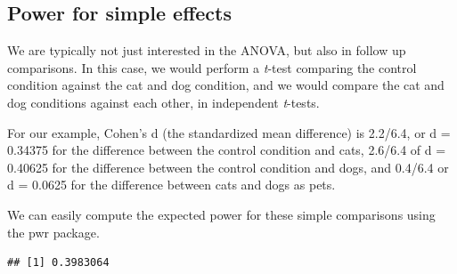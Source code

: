 \documentclass[
]{book}
\newenvironment{Shaded}{\begin{snugshade}}{\end{snugshade}}
\newcommand{\DataTypeTok}[1]{\textcolor[rgb]{0.13,0.29,0.53}{#1}}
\newcommand{\DecValTok}[1]{\textcolor[rgb]{0.00,0.00,0.81}{#1}}
\newcommand{\FloatTok}[1]{\textcolor[rgb]{0.00,0.00,0.81}{#1}}
\newcommand{\KeywordTok}[1]{\textcolor[rgb]{0.13,0.29,0.53}{\textbf{#1}}}
\newcommand{\NormalTok}[1]{#1}
\newcommand{\OperatorTok}[1]{\textcolor[rgb]{0.81,0.36,0.00}{\textbf{#1}}}
\newcommand{\StringTok}[1]{\textcolor[rgb]{0.31,0.60,0.02}{#1}}
\begin{document}
\hypertarget{power-for-simple-effects}{%
\subsection{Power for simple effects}\label{power-for-simple-effects}}

We are typically not just interested in the ANOVA, but also in follow up comparisons. In this case, we would perform a \emph{t}-test comparing the control condition against the cat and dog condition, and we would compare the cat and dog conditions against each other, in independent \emph{t}-tests.

For our example, Cohen's d (the standardized mean difference) is 2.2/6.4, or d = 0.34375 for the difference between the control condition and cats, 2.6/6.4 of d = 0.40625 for the difference between the control condition and dogs, and 0.4/6.4 or d = 0.0625 for the difference between cats and dogs as pets.

We can easily compute the expected power for these simple comparisons using the pwr package.

\begin{Shaded}
\end{Shaded}

\begin{verbatim}
## [1] 0.3983064
\end{verbatim}

\begin{Shaded}
\end{Shaded}
\end{document}
